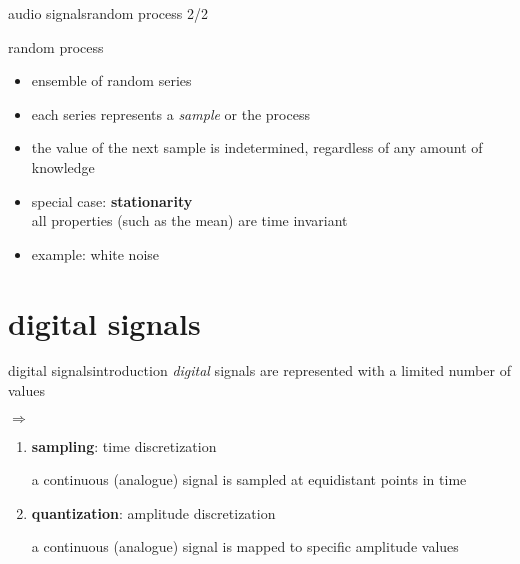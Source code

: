         \begin{frame}{audio signals}{random process 2/2}
            \toremember{}
            
            \begin{block}{random process}
                \begin{itemize}
                    \item   ensemble of random series
                    \item   each series represents a \textit{sample} or the process
                    \item   the value of the next sample is indetermined, regardless of any amount of knowledge
                \end{itemize}
            \end{block}
            \begin{itemize}
                \item   special case: \textbf{stationarity}\\ all properties (such as the mean) are time invariant
                \item   example: white noise
            \end{itemize}
        \end{frame}
            
    \section[digital]{digital signals}
        \begin{frame}{digital signals}{introduction}
            \textit{digital} signals are represented with a limited number of values
            \pause
            
            \bigskip
            $\Rightarrow$
            \begin{enumerate}
                \item	\textbf{sampling}: time discretization
                
                a continuous (analogue) signal is sampled at equidistant points in time
                
                \smallskip
                \item	\textbf{quantization}: amplitude discretization
                
                a continuous (analogue) signal is mapped to specific amplitude values
            \end{enumerate}
        \end{frame}
            
